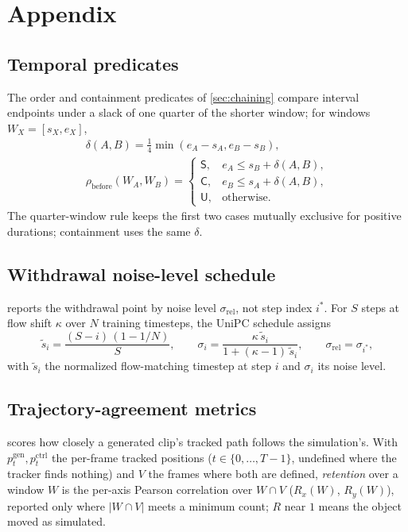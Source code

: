 \appendix
\section{Appendix}\label{sec:appendix}

\subsection{Temporal predicates}\label{sec:app-temporal}
The order and containment predicates of \cref{sec:chaining} compare interval endpoints under a slack
of one quarter of the shorter window; for windows $W_X=[s_X,e_X]$,
\begin{equation}
\begin{gathered}
\delta(A,B)=\tfrac14
  \min(e_A-s_A,e_B-s_B),\\
\rho_{\mathrm{before}}(W_A,W_B)
=
\begin{cases}
\mathsf{S}, & e_A\leq s_B+\delta(A,B),\\
\mathsf{C}, & e_B\leq s_A+\delta(A,B),\\
\mathsf{U}, & \text{otherwise}.
\end{cases}
\end{gathered}
\label{eq:temporal-before}
\end{equation}
The quarter-window rule keeps the first two cases mutually exclusive for positive durations;
containment uses the same $\delta$.

\subsection{Withdrawal noise-level schedule}\label{sec:app-schedule}
 reports the withdrawal point by noise level $\sigma_{\mathrm{rel}}$, not
step index $i^{*}$. For $S$ steps at flow shift $\kappa$ over $N$ training timesteps, the UniPC
schedule assigns
\begin{equation}
\tilde{s}_i = \frac{(S-i)\,(1 - 1/N)}{S},
\qquad
\sigma_i = \frac{\kappa\,\tilde{s}_i}{1 + (\kappa-1)\,\tilde{s}_i},
\qquad
\sigma_{\mathrm{rel}} = \sigma_{i^{*}} ,
\label{eq:flow-sigma}
\end{equation}
with $\tilde{s}_i$ the normalized flow-matching timestep at step $i$ and $\sigma_i$ its noise level.

\subsection{Trajectory-agreement metrics}\label{sec:app-retention}
 scores how closely a generated clip's tracked path follows the simulation's.
With $p^{\mathrm{gen}}_t,p^{\mathrm{ctrl}}_t$ the per-frame tracked positions ($t\in\{0,\ldots,T-1\}$,
undefined where the tracker finds nothing) and $V$ the frames where both are defined,
\emph{retention} over a window $W$ is the per-axis Pearson correlation over $W\cap V$ ($R_x(W)$,
$R_y(W)$), reported only where $|W\cap V|$ meets a minimum count; $R$ near $1$ means the object moved
as simulated.

